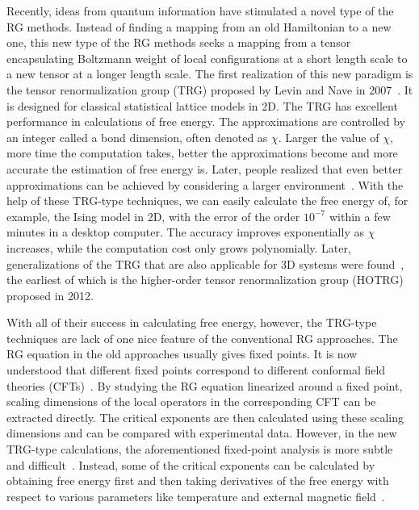 \documentclass[aps,prb,reprint,superscriptaddress]{revtex4-2}
\begin{document}
Recently, ideas from quantum information have stimulated a novel type of
the RG methods. Instead of finding a mapping from an old Hamiltonian to
a new one, this new type of the RG methods seeks a mapping from a tensor
encapsulating Boltzmann weight of local configurations at a short length
scale to a new tensor at a longer length scale. The first realization of
this new paradigm is the tensor renormalization group (TRG) proposed by
Levin and Nave in 2007~\cite{trg}. It is designed for classical
statistical lattice models in 2D.  The TRG has excellent performance in
calculations of free energy. The approximations are controlled by an
integer called a bond dimension, often denoted as $\chi$. Larger the
value of $\chi$, more time the computation takes, better the
approximations become and more accurate the estimation of free energy
is. Later, people realized that even better approximations can be
achieved by considering a larger
environment~\cite{SRGa,SRGb,hotrg,morita2020global}. With the help of
these TRG-type techniques, we can easily calculate the free energy of,
for example, the Ising model in 2D, with the error of the order
$10^{-7}$ within a few minutes in a desktop computer. The accuracy
improves exponentially as $\chi$ increases, while the computation cost
only grows polynomially. Later, generalizations of the TRG that are also
applicable for 3D systems were found~\cite{hotrg,atrg,triadtrg}, the
earliest of which is the higher-order tensor renormalization group
(HOTRG)~\cite{hotrg} proposed in 2012.
%

With all of their success in calculating free energy, however, the
TRG-type techniques are lack of one nice feature of the conventional RG
approaches. The RG equation in the old approaches usually gives fixed
points. It is now understood that different fixed points correspond to
different conformal field theories
(CFTs)~\cite{polchinski1988,nakayama2015}. By studying the RG equation
linearized around a fixed point, scaling dimensions of the local
operators in the corresponding CFT can be extracted directly. The
critical exponents are then calculated using these scaling dimensions
and can be compared with experimental data. However, in the new TRG-type
calculations, the aforementioned fixed-point analysis is more subtle and
difficult~\cite{kadanoff2014}.  Instead, some of the critical exponents
can be calculated by obtaining free energy first and then taking
derivatives of the free energy with respect to various parameters like
temperature and external magnetic field~\cite{hotrg,
Berker2008,xiang2019adtrg}. 
%
\end{document}
